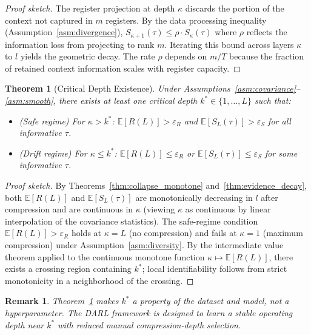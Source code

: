 \documentclass[lettersize,journal]{IEEEtran}
\newtheorem{theorem}{Theorem}
\newtheorem{remark}{Remark}
\newcommand{\E}{\mathbb{E}}
\begin{document}
\begin{proof}[Proof sketch]
The register projection at depth $\kappa$ discards the portion
of the context not captured in $m$ registers.
By the data processing inequality
(Assumption~\ref{asm:divergence}), $S_{\kappa+1}(\tau) \leq
\rho \cdot S_\kappa(\tau)$ where $\rho$ reflects the information
loss from projecting to rank $m$.
Iterating this bound across layers $\kappa$ to $l$ yields the
geometric decay.
The rate $\rho$ depends on $m/T$ because the fraction of retained
context information scales with register capacity.
\end{proof}

\begin{theorem}[Critical Depth Existence]
\label{thm:critical_depth}
Under Assumptions~\ref{asm:covariance}--\ref{asm:smooth},
there exists at least one critical depth
$k^* \in \{1,\ldots,L\}$ such that:
\begin{itemize}
  \item (Safe regime) For $\kappa > k^*$:
    $\E[R(L)] > \varepsilon_R$ and
    $\E[S_L(\tau)] > \varepsilon_S$ for all informative $\tau$.
  \item (Drift regime) For $\kappa \leq k^*$:
    $\E[R(L)] \leq \varepsilon_R$ or
    $\E[S_L(\tau)] \leq \varepsilon_S$ for some informative $\tau$.
\end{itemize}
\end{theorem}

\begin{proof}[Proof sketch]
By Theorems~\ref{thm:collapse_monotone} and~\ref{thm:evidence_decay},
both $\E[R(L)]$ and $\E[S_L(\tau)]$ are monotonically decreasing
in $l$ after compression and are continuous in $\kappa$ (viewing
$\kappa$ as continuous by linear interpolation of the covariance
statistics).
The safe-regime condition $\E[R(L)] > \varepsilon_R$ holds at
$\kappa = L$ (no compression) and fails at $\kappa = 1$ (maximum
compression) under Assumption~\ref{asm:diversity}.
By the intermediate value theorem applied to the continuous
monotone function $\kappa \mapsto \E[R(L)]$, there exists a
crossing region containing $k^*$; local identifiability follows
from strict monotonicity in a neighborhood of the crossing.
\end{proof}

\begin{remark}
Theorem~\ref{thm:critical_depth} makes $k^*$ a property of the
dataset and model, not a hyperparameter.
The DARL framework is designed to learn a stable operating depth
near $k^*$ with reduced manual compression-depth selection.
\end{remark}
\end{document}
